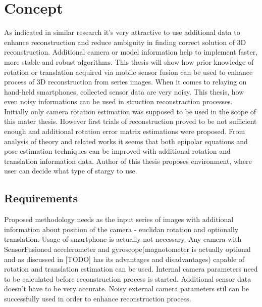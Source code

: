 
\chapter{Concept} %
As indicated in similar research it's very attractive to use additional data to enhance reconstruction and reduce ambiguity in finding correct solution of 3D reconstruction. Additional camera or model information help to implement faster, more stable and robust algorithms. This thesis will show how prior knowledge of rotation or translation acquired via mobile sensor fusion can be used to enhance process of 3D reconstruction from series images. When it comes to relaying on hand-held smartphones, collected sensor data are very noisy. This thesis, how even noisy informations can be used in struction reconstraction processes. Initially only camera rotation estimation was supposed to be used in the scope of this mater thesis. However first trials of reconstruction proved to be not sufficient enough and additional rotation error matrix estimations were proposed.
From analysis of theory and related works it seems that both epipolar equations and pose estimation techniques can be improved with additional rotation and translation information data.  Author of this thesis proposes environment, where user can decide what type of stargy to use.
\section{Requirements}
Proposed methodology needs as the input series of images with additional information about position of the camera - euclidan rotation and optionally translation. Usage of smartphone is actually not necessary. Any camera with SensorFusioned accelerometer and gyroscope(magnotometer is actually optional and as discussed in [TODO] has its advantages and disadvantages) capable of rotation and translation estimation can be used. Internal camera parameters need to be calculated before reconstruction process is started. Additional sensor data doesn't have to be very accurate. Noisy external camera parameters stil can be successfully used in order to enhance reconstruction process.
